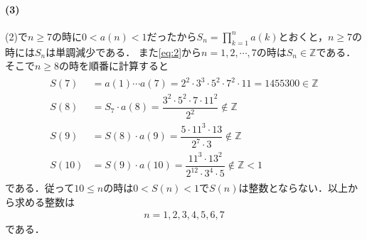 \documentclass[../../main.tex]{subfiles}
\begin{document}
\paragraph{(3)}
(2)で$n\ge7$の時に$0<a(n)<1$だったから$S_n=\displaystyle\prod_{k=1}^na(k)$とおくと，$n\ge7$の時には$S_n$は単調減少である．
また\cref{eq:2}から$n=1,2,\cdots,7$の時は$S_n\in\mathbb{Z}$である．そこで$n\ge8$の時を順番に計算すると
\begin{align}
  \begin{split}
    S(7)&=a(1)\cdots a(7)=2^2\cdot3^3\cdot5^2\cdot7^2\cdot11=1455300\in\mathbb{Z} \\
    S(8)&=S_7\cdot a(8)=\dfrac{3^2\cdot5^2\cdot7\cdot11^2}{2^2}\notin\mathbb{Z} \\
    S(9)&=S(8)\cdot a(9)=\dfrac{5\cdot11^3\cdot13}{2^7\cdot3}\notin\mathbb{Z} \\
    S(10)&=S(9)\cdot a(10)=\dfrac{11^3\cdot13^2}{2^{12}\cdot3^4\cdot5}\notin\mathbb{Z}<1
  \end{split}
\end{align}
である．従って$10\le n$の時は$0<S(n)<1$で$S(n)$は整数とならない．以上から求める整数は
\begin{align}
  n=1,2,3,4,5,6,7
\end{align}
である．

\newpage
\end{document}
